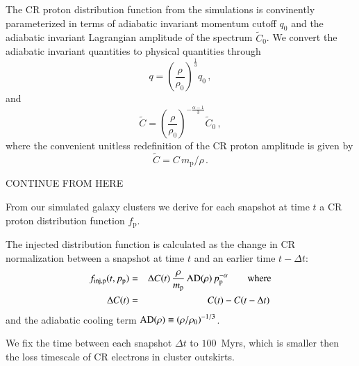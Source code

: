 \documentclass[useAMS,usenatbib]{mn2e}
\def\del#1{{}}
\newcommand{\dd}{\mathrm{d}}
\newcommand{\eps}{\varepsilon}
\newcommand{\p}{\mathrm{p}}
\newcommand{\CR}{\mathrm{CR}}
\newcommand{\B}{\mathrm{B}}
\begin{document}
The CR proton distribution function from the simulations is
convinently parameterized in terms of adiabatic invariant momentum
cutoff $q_0$ and the adiabatic invariant Lagrangian amplitude of the
spectrum $\tilde{C}_0$. We convert the adiabatic invariant quantities
to physical quantities through
\begin{equation}
  \label{eq:q0}
  q=\left(\frac{\rho}{\rho_0}\right)^{\frac{1}{3}}q_0\,,
\end{equation}
and
\begin{equation}
  \label{eq:C0}
  \tilde{C}=\left(\frac{\rho}{\rho_0}\right)^{-\frac{\alpha-1}{3}}\tilde{C}_0\,,
\end{equation}
where the convenient unitless redefinition of the CR proton amplitude
is given by
\begin{equation}
  \label{eq:Ct}
  \tilde{C}=C\,m_\p/\rho\,.
\end{equation}

CONTINUE FROM HERE

From our simulated galaxy clusters we derive for each snapshot at time
$t$ a CR proton distribution function $f_\p$. 

\del{We select
particles in the outskirts of clusters where the gas densities are low
and hence the Coulomb cooling of the CR protons small.}

The injected distribution function is calculated as the change in
CR normalization between a snapshot at time $t$ and an earlier time 
$t-\Delta t$:
\begin{eqnarray}
  \label{eq:finj}
f_\rmn{inj,p}(t,p_\p) &=& \Delta C(t)\,\frac{\rho}{m_\p}\,\rmn{AD(\rho)} \,p_\p^{-\alpha}\qquad\rmn{where}\\
  \Delta  C(t) &=& C(t) - C(t-\Delta t)\,
\end{eqnarray}
and the adiabatic cooling term ${\mathrm{AD}}(\rho)\equiv\left(\rho/\rho_0\right)^{-1/3}$.

We fix the time between each snapshot $\Delta t$ to $100$~Myrs, which
is smaller then the loss timescale of CR electrons in cluster
outskirts. 

\del{The CR proton number density is given by
\begin{equation}
  \label{eq:ncr}
  n_{\CR} = \int_0^\infty \dd p_\p\, f_\p(p_\p) =
  \frac{C\, q^{1-\alpha}}{\alpha-1}\,,
\end{equation}
provided $\alpha >1$. The kinetic energy density of the CR
proton population is
\begin{eqnarray}
  \label{eq:epscr}
  \eps_\CR &=& \int_0^\infty  \dd p_\p\, f_\p(p_\p) \,T_{\rmn
    p}(p_\p)=\frac{C\, m_\p\,c^2}{\alpha-1} \, \times
  \nonumber \\
  && \left[\frac{1}{2}
    \, \B_{\frac{1}{1+q^2}} \left(
    \frac{\alpha-2}{2},\frac{3-\alpha}{2}\right) + q^{1-\alpha}
    \left(\sqrt{1+q^2}-1 \right) \right] \,,
\end{eqnarray}
where $T_\p(p_\p) = (\sqrt{1+p_\p^2} -1)\, m_\p\,c^2$ is the kinetic energy
of a CR proton. $\B_x(a,b)$ denotes the incomplete Beta-function, and
$\alpha>2$ is assumed.}
\end{document}
